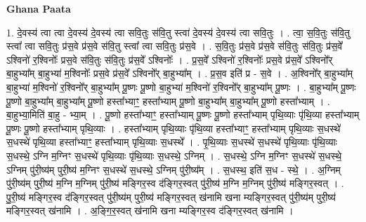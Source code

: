 \documentclass[17pt]{extarticle}
\begin{document}
\textbf{Ghana Paata } \newline

1. दे॒वस्य॑ त्वा त्वा दे॒वस्य॑ दे॒वस्य॑ त्वा सवि॒तुः स॑वि॒तु स्त्वा॑ दे॒वस्य॑ दे॒वस्य॑ त्वा सवि॒तुः । . त्वा॒ स॒वि॒तुः स॑वि॒तु स्त्वा᳚ त्वा सवि॒तुः प्र॑स॒वे प्र॑स॒वे स॑वि॒तु स्त्वा᳚ त्वा सवि॒तुः प्र॑स॒वे । . स॒वि॒तुः प्र॑स॒वे प्र॑स॒वे स॑वि॒तुः स॑वि॒तुः प्र॑स॒वे᳚ ऽश्विनो॑ र॒श्विनोः᳚ प्रस॒वे स॑वि॒तुः स॑वि॒तुः प्र॑स॒वे᳚ ऽश्विनोः᳚ । . प्र॒स॒वे᳚ ऽश्विनो॑ र॒श्विनोः᳚ प्रस॒वे प्र॑स॒वे᳚ ऽश्विनो᳚र् बा॒हुभ्या᳚म् बा॒हुभ्या॑ म॒श्विनोः᳚ प्रस॒वे प्र॑स॒वे᳚ ऽश्विनो᳚र् बा॒हुभ्या᳚म् । . प्र॒स॒व इति॑ प्र - स॒वे । . अ॒श्विनो᳚र् बा॒हुभ्या᳚म् बा॒हुभ्या॑ म॒श्विनो॑ र॒श्विनो᳚र् बा॒हुभ्या᳚म् पू॒ष्णः पू॒ष्णो बा॒हुभ्या॑ म॒श्विनो॑ र॒श्विनो᳚र् बा॒हुभ्या᳚म् पू॒ष्णः । . बा॒हुभ्या᳚म् पू॒ष्णः पू॒ष्णो बा॒हुभ्या᳚म् बा॒हुभ्या᳚म् पू॒ष्णो हस्ता᳚भ्याꣳ॒॒ हस्ता᳚भ्याम् पू॒ष्णो बा॒हुभ्या᳚म् बा॒हुभ्या᳚म् पू॒ष्णो हस्ता᳚भ्याम् । . बा॒हुभ्या॒मिति॑ बा॒हु - भ्या॒म् । . पू॒ष्णो हस्ता᳚भ्याꣳ॒॒ हस्ता᳚भ्याम् पू॒ष्णः पू॒ष्णो हस्ता᳚भ्याम् पृथि॒व्याः पृ॑थि॒व्या हस्ता᳚भ्याम् पू॒ष्णः पू॒ष्णो हस्ता᳚भ्याम् पृथि॒व्याः । . हस्ता᳚भ्याम् पृथि॒व्याः पृ॑थि॒व्या हस्ता᳚भ्याꣳ॒॒ हस्ता᳚भ्याम् पृथि॒व्याः स॒धस्थे॑ स॒धस्थे॑ पृथि॒व्या हस्ता᳚भ्याꣳ॒॒ हस्ता᳚भ्याम् पृथि॒व्याः स॒धस्थे᳚ । . पृ॒थि॒व्याः स॒धस्थे॑ स॒धस्थे॑ पृथि॒व्याः पृ॑थि॒व्याः स॒धस्थे॒ ऽग्नि म॒ग्निꣳ स॒धस्थे॑ पृथि॒व्याः पृ॑थि॒व्याः स॒धस्थे॒ ऽग्निम् । . स॒धस्थे॒ ऽग्नि म॒ग्निꣳ स॒धस्थे॑ स॒धस्थे॒ ऽग्निम् पु॑री॒ष्य॑म् पुरी॒ष्य॑ म॒ग्निꣳ स॒धस्थे॑ स॒धस्थे॒ ऽग्निम् पु॑री॒ष्य᳚म् । . स॒धस्थ॒ इति॑ स॒ध - स्थे॒ । . अ॒ग्निम् पु॑री॒ष्य॑म् पुरी॒ष्य॑ म॒ग्नि म॒ग्निम् पु॑री॒ष्य॑ मङ्गिर॒स्व द॑ङ्गिर॒स्वत् पु॑री॒ष्य॑ म॒ग्नि म॒ग्निम् पु॑री॒ष्य॑ मङ्गिर॒स्वत् । . पु॒री॒ष्य॑ मङ्गिर॒स्व द॑ङ्गिर॒स्वत् पु॑री॒ष्य॑म् पुरी॒ष्य॑ मङ्गिर॒स्वत् ख॑नामि खना म्यङ्गिर॒स्वत् पु॑री॒ष्य॑म् पुरी॒ष्य॑ मङ्गिर॒स्वत् ख॑नामि । . अ॒ङ्गि॒र॒स्वत् ख॑नामि खना म्यङ्गिर॒स्व द॑ङ्गिर॒स्वत् ख॑नामि । \newline
\end{document}
